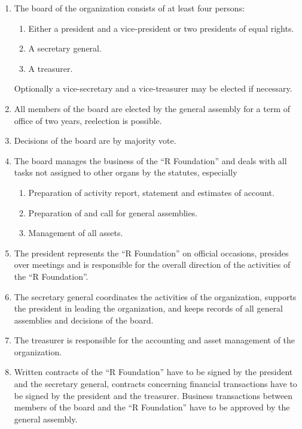 \documentclass[a4paper]{article}
\newcommand{\RF}{"`R Foundation"'}
\begin{document}
\begin{enumerate}
  \item
   The board of the organization consists of at least four
   persons:
   \begin{enumerate}
    \item Either a president and a vice-president or two presidents of
     equal rights.
    \item A secretary general.
    \item A treasurer.
   \end{enumerate}
   Optionally a vice-secretary and a vice-treasurer may be elected if
   necessary.
   
  \item All members of the board are elected by the general assembly
   for a term of office of two years, reelection is possible.
   
  \item Decisions of the board are by majority vote.
   
  \item The board manages the business of the \RF{} and deals with all
   tasks not assigned to other organs by the statutes, especially
   \begin{enumerate}
    \item Preparation of activity report, statement and estimates of
     account.
    \item Preparation of and call for general assemblies.
    \item Management of all assets.
  \end{enumerate}
  
 \item The president represents the \RF{} on official occasions,
  presides over meetings and is responsible for the overall direction
  of the activities of the \RF{}.
  
 \item The secretary general coordinates the activities of the
  organization, supports the president in leading the organization,
  and keeps records of all general assemblies and decisions of the
  board.
  
 \item The treasurer is responsible for the accounting and asset
  management of the organization.
  
 \item Written contracts of the \RF{} have to be signed by the
  president and the secretary general, contracts concerning financial
  transactions have to be signed by the president and the
  treasurer. Business transactions between members of the board and the
  \RF{} have to be approved by the general assembly.
\end{enumerate}
\end{document}
